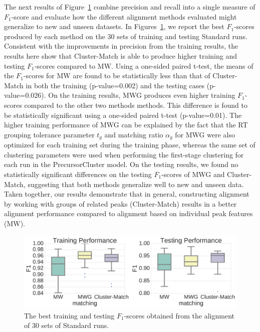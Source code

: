 The next results of Figure~\ref{fig:pairwise-training-testing} combine precision and recall into a single measure of $F_1$-score and evaluate how the different alignment methods evaluated might generalize to new and unseen datasets. In Figures~\ref{fig:pairwise-training-testing}, we report the best $F_1$-scores produced by each method on the 30 sets of training and testing Standard runs. Consistent with the improvements in precision from the training results, the results here show that Cluster-Match is able to produce higher training and testing $F_1$-scores compared to MW. Using a one-sided paired t-test, the means of the $F_1$-scores for MW are found to be statistically less than that of Cluster-Match in both the training (p-value=0.002) and the testing cases (p-value=0.026). On the training results, MWG produces even higher training $F_1$-scores compared to the other two methods methods. This difference is found to be statistically significant using a one-sided paired t-test (p-value=0.01). The higher training performance of MWG can be explained by the fact that the RT grouping tolerance parameter $t_g$ and matching ratio $\alpha_g$ for MWG were also optimized for each training set during the training phase, whereas the same set of clustering parameters were used when performing the first-stage clustering for each run in the PrecursorCluster model. On the testing results, we found no statistically significant differences on the testing $F_1$-scores of MWG and Cluster-Match, suggesting that both methods generalize well to new and unseen data. Taken together, our results demonstrate that in general, constructing alignment by working with groups of related peaks (Cluster-Match) results in a better alignment performance compared to alignment based on individual peak features (MW).

\begin{figure}[!htbp]
\centering\includegraphics[width=0.75\linewidth]{05-precursor-cluster/figures/fig3.pdf}
\caption{\label{fig:pairwise-training-testing} The best training and testing $F_1$-scores obtained from the alignment of 30 sets of Standard runs.}
\end{figure}

